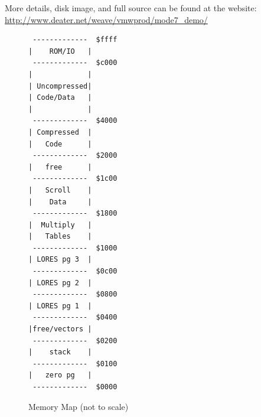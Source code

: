 \documentclass[twocolumn]{article}
\begin{document}
More details, disk image, and full source can be found at the website:
\url{http://www.deater.net/weave/vmwprod/mode7_demo/}



\begin{figure}
\begin{center}
\begin{scriptsize}
\begin{BVerbatim}
 -------------  $ffff
|    ROM/IO   |
 -------------  $c000
|             |
| Uncompressed|
| Code/Data   |
|             |
 -------------  $4000
| Compressed  |
|   Code      |
 -------------  $2000
|   free      |
 -------------  $1c00
|   Scroll    |
|    Data     |
 -------------  $1800
|  Multiply   |
|   Tables    |	
 -------------  $1000
| LORES pg 3  |
 -------------  $0c00
| LORES pg 2  |
 -------------  $0800
| LORES pg 1  |
 -------------  $0400
|free/vectors |
 -------------  $0200
|    stack    |
 -------------  $0100
|   zero pg   |
 -------------  $0000
\end{BVerbatim}
\end{scriptsize}
\end{center}
\caption{Memory Map (not to scale)\label{fig:map}}
\end{figure}
\end{document}
